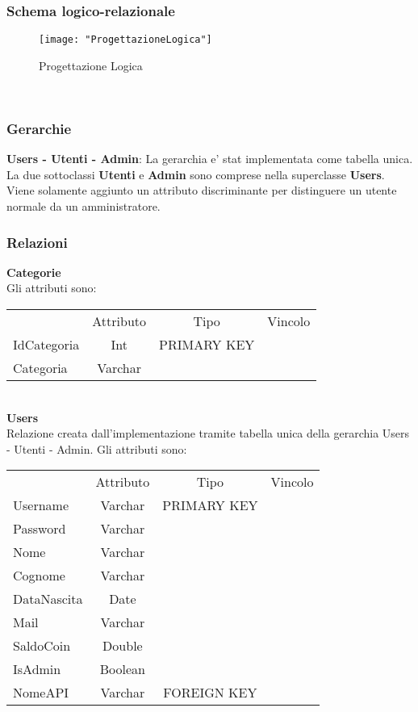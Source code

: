 {{		\subsubsection{Schema logico-relazionale}
		\begin{figure}[ht]
			\centering
			\texttt{[image: "ProgettazioneLogica"]}
			\caption{Progettazione Logica}
			\label{Fig. Progettazione Logica}
		\end{figure} \\
		\subsubsection{Gerarchie}
		\textbf{Users - Utenti - Admin}: La gerarchia e' stat implementata come tabella unica. La due sottoclassi \textbf{Utenti} e \textbf{Admin} sono comprese nella superclasse \textbf{Users}. Viene solamente aggiunto un attributo discriminante per distinguere un utente normale da un amministratore.\\
		\subsubsection{Relazioni}
		\textbf{Categorie}\\
		Gli attributi sono: \\
			\begin{center}
			\begin{tabular}{lccc}
				&Attributo&Tipo&Vincolo\\
				IdCategoria&Int&PRIMARY KEY\\
				Categoria&Varchar& \\
			\end{tabular}
			\end{center}\\
			
		\textbf{Users}\\
			Relazione creata dall'implementazione tramite tabella unica della gerarchia Users - Utenti - Admin. Gli attributi sono:
			\begin{center}
			\begin{tabular}{lccc}
				&Attributo&Tipo&Vincolo\\
				Username&Varchar&PRIMARY KEY\\
				Password&Varchar& \\				
				Nome&Varchar& \\
				Cognome&Varchar& \\
				DataNascita&Date& \\				
				Mail&Varchar& \\
				SaldoCoin&Double& \\
				IsAdmin&Boolean& \\
				NomeAPI&Varchar&FOREIGN KEY\\
			\end{tabular}
			\end{center} \\					
			
}}
